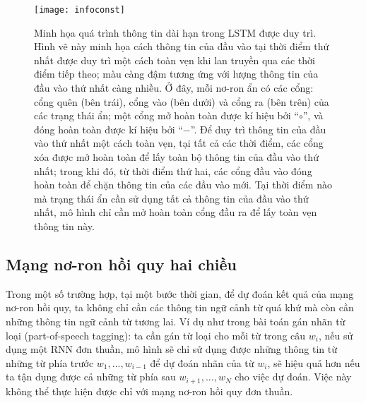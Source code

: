 \begin{figure}
	\centering
	\texttt{[image: infoconst]}
	\caption[Minh họa quá trình thông tin dài hạn trong LSTM được duy trì]{Minh họa quá trình thông tin dài hạn trong LSTM được duy trì. Hình vẽ này minh họa cách thông tin của đầu vào tại thời điểm thứ nhất được duy trì một cách toàn vẹn khi lan truyền qua các thời điểm tiếp theo; màu càng đậm tương ứng với lượng thông tin của đầu vào thứ nhất càng nhiều. Ở đây, mỗi nơ-ron ẩn có các cổng: cổng quên (bên trái), cổng vào (bên dưới) và cổng ra (bên trên) của các trạng thái ẩn; một cổng mở hoàn toàn được kí hiệu bởi “$\circ$”, và đóng hoàn toàn được kí hiệu bởi “$-$”. Để duy trì thông tin của đầu vào thứ nhất một cách toàn vẹn, tại tất cả các thời điểm, các cổng xóa được mở hoàn toàn để lấy toàn bộ thông tin của đầu vào thứ nhất; trong khi đó, từ thời điểm thứ hai, các cổng đầu vào đóng hoàn toàn để chặn thông tin của các đầu vào mới. Tại thời điểm nào mà trạng thái ẩn cần sử dụng tất cả thông tin của đầu vào thứ nhất, mô hình chỉ cần mở hoàn toàn cổng đầu ra để lấy toàn vẹn thông tin này.}
	\label{fig_infomorphing}
\end{figure}



\subsection{Mạng nơ-ron hồi quy hai chiều}

Trong một số trường hợp, tại một bước thời gian, để dự đoán kết quả của mạng nơ-ron hồi quy, ta không chỉ cần các thông tin ngữ cảnh từ quá khứ mà còn cần những thông tin ngữ cảnh từ tương lai. Ví dụ như trong bài toán gán nhãn từ loại (part-of-speech tagging): ta cần gán từ loại cho mỗi từ trong câu $w_i$, nếu sử dụng một RNN đơn thuần, mô hình sẽ chỉ sử dụng được những thông tin từ những từ phía trước $w_1,...,w_{i-1}$ để dự đoán nhãn của từ $w_i$, sẽ hiệu quả hơn nếu ta tận dụng được cả những từ phía sau $w_{i+1},...,w_{N}$ cho việc dự đoán. Việc này không thể thực hiện được chỉ với mạng nơ-ron hồi quy đơn thuần. 


